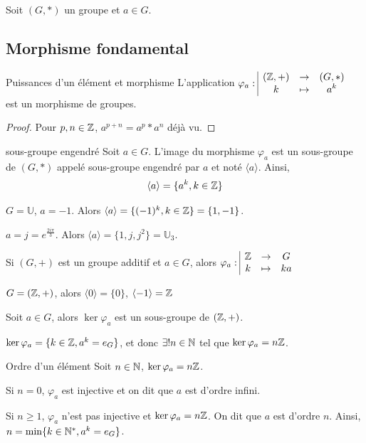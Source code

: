Soit $(G, \ast)$ un groupe et $a \in G$.

\subsection{Morphisme fondamental}
\begin{theoreme}{Puissances d'un élément et morphisme}{}
    L'application $\varphi_a: \space \begin{array}{|ccc} \displaystyle (\mathbb{Z}, +) & \to & \displaystyle (G, \ast) \\ \displaystyle k & \mapsto & \displaystyle a^k \end{array}$ est un morphisme de groupes.
\end{theoreme}

\begin{proof}
    Pour $p, n \in \mathbb{Z}$, $a^{p + n} = a^p \ast a^n$ déjà vu. 
\end{proof}

\begin{definition}{sous-groupe engendré}{}
    Soit $a \in G$. 
    L'image du morphisme $\varphi_a$ est un sous-groupe de $(G, \ast)$ appelé
    sous-groupe engendré par $a$ et noté $\langle a \rangle$. 
    Ainsi, 
    $$\langle a \rangle = \{a^k, k \in \mathbb{Z}\}$$
\end{definition}

\begin{exemple}
    $G = \mathbb U$, $a = -1$. 
    Alors $\langle a \rangle = \{(-1)^k, k \in \mathbb{Z}\} = \{1, -1\}$.

    $\displaystyle a = j = e^{\frac{2i\pi}3}$.
    Alors $\langle a \rangle = \{1, j, j^2\} = \mathbb U_3$.
\end{exemple}


\begin{remarque}
    Si $(G, +)$ est un groupe additif et $a \in G$, alors 
    $\varphi_a: \space \begin{array}{|ccc} \displaystyle \mathbb{Z} & \to & \displaystyle G \\ \displaystyle k & \mapsto & \displaystyle ka \end{array}$ 
\end{remarque}

\begin{exemple}
    $G = (\mathbb{Z}, +)$, alors $\langle 0 \rangle = \{0\}$, $\langle -1 \rangle = \mathbb{Z}$
\end{exemple}

\begin{definition}{}{}
    Soit $a \in G$, alors $\ker \varphi_a$ est un sous-groupe de $(\mathbb{Z}, +)$. 

    $\ker \varphi_a = \{k \in \mathbb{Z}, a^k = e_G\}$, et donc 
    $\exists ! n \in \mathbb{N}$ tel que $\ker \varphi_a = n \mathbb{Z}$. 
\end{definition}

\begin{definition}{Ordre d'un élément}{}
    Soit $n \in \mathbb{N}$, 
    $\ker \varphi_a = n\mathbb{Z}$. 

    Si $n = 0$, $\varphi_a$ est injective et on dit que $a$ est d'ordre infini.

    Si $n \geq 1$, $\varphi_a$ n'est pas injective et $\ker \varphi_a = n \mathbb{Z}$.
    On dit que $a$ est d'ordre $n$. Ainsi, $n = \min \{k \in \mathbb{N}^*, a^k = e_G\}$.
\end{definition}

